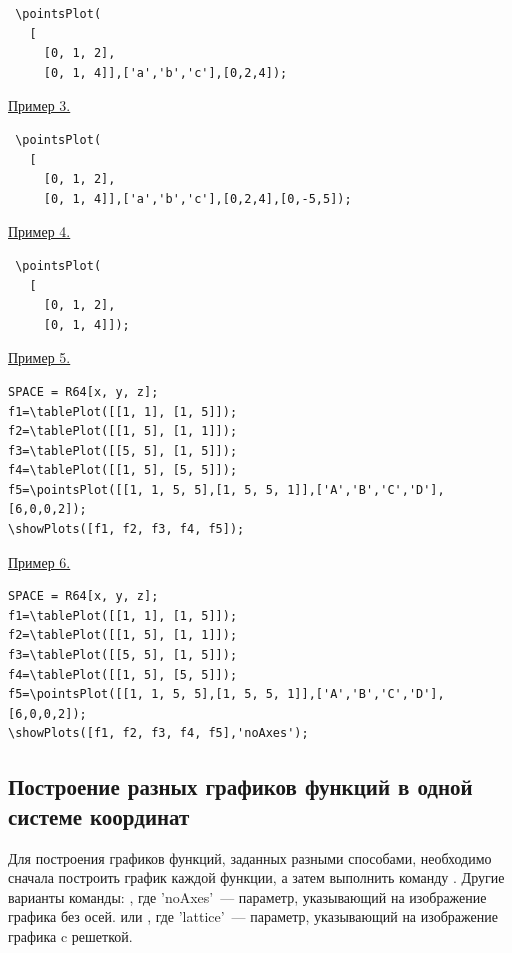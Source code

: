  \vspace*{-2mm}

 \begin{verbatim}
 \pointsPlot(
   [
     [0, 1, 2],
     [0, 1, 4]],['a','b','c'],[0,2,4]);
 \end{verbatim}

\underline{Пример 3.}
 
 \vspace*{-2mm}

 \begin{verbatim}
 \pointsPlot(
   [
     [0, 1, 2],
     [0, 1, 4]],['a','b','c'],[0,2,4],[0,-5,5]);
 \end{verbatim}

\underline{Пример 4.}
 
 \vspace*{-2mm}

 \begin{verbatim}
 \pointsPlot(
   [
     [0, 1, 2],
     [0, 1, 4]]);
 \end{verbatim}

\underline{Пример 5.}
 
 \vspace*{-2mm}

 \begin{verbatim}
SPACE = R64[x, y, z];
f1=\tablePlot([[1, 1], [1, 5]]);
f2=\tablePlot([[1, 5], [1, 1]]);
f3=\tablePlot([[5, 5], [1, 5]]);
f4=\tablePlot([[1, 5], [5, 5]]);
f5=\pointsPlot([[1, 1, 5, 5],[1, 5, 5, 1]],['A','B','C','D'],[6,0,0,2]);
\showPlots([f1, f2, f3, f4, f5]);
 \end{verbatim}

\underline{Пример 6.}
 
 \vspace*{-2mm}

 \begin{verbatim}
SPACE = R64[x, y, z];
f1=\tablePlot([[1, 1], [1, 5]]);
f2=\tablePlot([[1, 5], [1, 1]]);
f3=\tablePlot([[5, 5], [1, 5]]);
f4=\tablePlot([[1, 5], [5, 5]]);
f5=\pointsPlot([[1, 1, 5, 5],[1, 5, 5, 1]],['A','B','C','D'],[6,0,0,2]);
\showPlots([f1, f2, f3, f4, f5],'noAxes');
 \end{verbatim}

\subsection{Построение разных графиков функций в одной системе координат}
Для построения графиков функций,  заданных разными способами,  необходимо сначала построить график каждой функции,  а затем выполнить команду
.
Другие варианты команды:
, где 'noAxes'~--- параметр, указывающий на изображение графика без осей.
или
, где 'lattice'~--- параметр, указывающий на изображение графика c решеткой.

